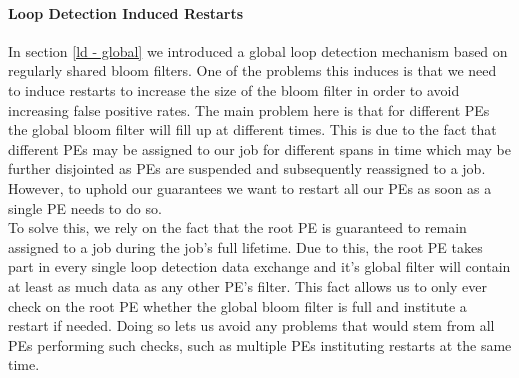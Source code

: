 \paragraph{Loop Detection Induced Restarts}
In section \ref{ld - global} we introduced a global loop detection mechanism based on regularly shared bloom filters. One of the problems this induces is that we need to induce restarts to increase the size of the bloom filter in order to avoid increasing false positive rates. The main problem here is that for different PEs the global bloom filter will fill up at different times. This is due to the fact that different PEs may be assigned to our job for different spans in time which may be further disjointed as PEs are suspended and subsequently reassigned to a job. However, to uphold our guarantees we want to restart all our PEs as soon as a single PE needs to do so.\\
To solve this, we rely on the fact that the root PE is guaranteed to remain assigned to a job during the job's full lifetime. Due to this, the root PE takes part in every single loop detection data exchange and it's global filter will contain at least as much data as any other PE's filter. This fact allows us to only ever check on the root PE whether the global bloom filter is full and institute a restart if needed. Doing so lets us avoid any problems that would stem from all PEs performing such checks, such as multiple PEs instituting restarts at the same time.
